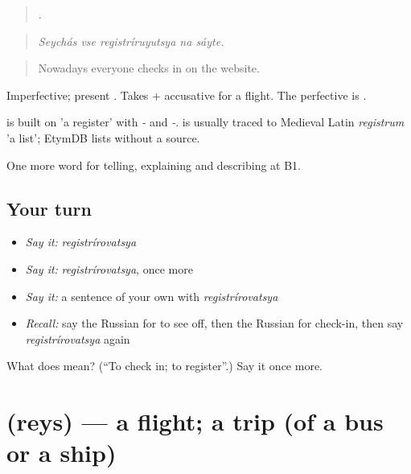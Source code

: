 \begin{quote}
    .
\end{quote}

\begin{quote}
\emph{Seychás vse registríruyutsya na sáyte.}
\end{quote}

\begin{quote}
Nowadays everyone checks in on the website.
\end{quote}

Imperfective; present \emph{}. Takes \emph{} + accusative for a flight. The perfective is \emph{}.

\begin{cousinweb}
\emph{} is built on \emph{} 'a register' with \emph{-} and \emph{-}. \emph{} is usually traced to Medieval Latin \emph{registrum} 'a list'; EtymDB lists \emph{} without a source.
\end{cousinweb}

\begin{grammarlens}[title={What you've built}]
One more word for telling, explaining and describing at B1.
\end{grammarlens}

\subsection*{Your turn}
\begin{itemize}
\raggedright
  \item \emph{Say it:} \emph{registrírovatsya}
  \item \emph{Say it:} \emph{registrírovatsya}, once more
  \item \emph{Say it:} a sentence of your own with \emph{registrírovatsya}
  \item \emph{Recall:} say the Russian for to see off, then the Russian for check-in, then say \emph{registrírovatsya} again
\end{itemize}

\begin{tcolorbox}[breakable,colback=teal!4,colframe=teal!35!black,title={Before you move on}]
What does  mean? (\textquotedblleft{}To check in; to register\textquotedblright{}.) Say it once more.
\end{tcolorbox}
\section[\texorpdfstring{\ru{рейс} (reys)}{рейс (reys)}]{ (reys) — a flight; a trip (of a bus or a ship)}

